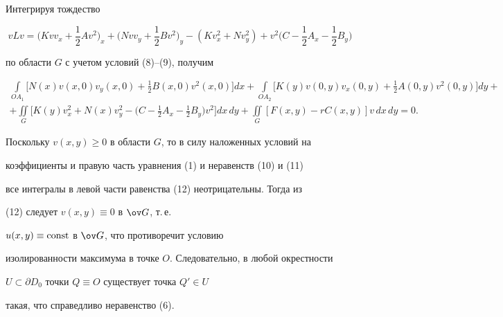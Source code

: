 \begin{pf}
Интегрируя тождество 


$$


vLv=\bigg(Kvv_x+\frac{1}{2}Av^2\bigg)_x+\bigg(Nvv_y+


\frac{1}{2}Bv^2\bigg)_y-


(Kv_x^2+Nv_y^2)+v^2\bigg(C-\frac{1}{2}A_x-\frac{1}{2}B_y\bigg)


$$


по области $G$ с учетом условий (8)--(9), получим 


\begin{multline}


\int \limits_{OA_1} \bigg


[N(x)v(x,0)v_y(x,0)+\frac{1}{2}B(x,0)v^2(x,0)\bigg]dx+


\int \limits_{OA_2}\bigg 


[K(y)v(0,y)v_x(0,y)+\frac{1}{2}A(0,y)v^2(0,y)\bigg]dy+ \\


%


+\iint\limits_{G}\bigg


[K(y)v_x^2+N(x)v_y^2-\bigg(C-\frac{1}{2}A_x-\frac{1}{2}B_y\bigg)v^2


\bigg]dx\,dy+


\iint\limits_G[F(x,y)-rC(x,y)]v\,dx\,dy=0.


\end{multline}


Поскольку $v(x,y)\ge 0$ в области $G$, то в силу наложенных условий на 


коэффициенты и правую часть уравнения (1) и неравенств (10) и (11) 


все интегралы в левой части равенства (12) неотрицательны. Тогда из 


(12) следует $v(x,y)\equiv 0$ в $\ov G$, т.\,е. 


$u(x,y)\equiv\operatorname{const}$ в $\ov G$, что противоречит условию 


изолированности максимума в точке $O$. Следовательно, в любой окрестности 


$U\subset \partial D_0$ точки $Q \equiv O$ существует точка $Q'\in U$


такая, что справедливо неравенство (6).


\end{pf}





